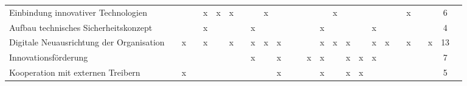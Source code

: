 \begin{sidewaystable}[ht]
\begin{tabular}{|p{6.5cm}|c|c|c|c|c|c|c|c|c|c|c|c|c|c|c|c|c|c|c|c|c|c|c|c|c|}
		Einbindung innovativer Technologien                 &                   &                    &                    & x                    & x                  & x                 &                   &                      & x                  &                      &                  &                  &                     &                  & x               &                      &                    &                 &                  &                  & x                      &                      &                        & 6  \\
		Aufbau technisches Sicherheitskonzept      &                   &                    &                    & x                    &                    &                   &                   & x                    &                    &                      &                  &                  &                     & x                &                 &                      &                    & x               &                  &                  &                        &                      &                        & 4  \\
		Digitale Neuausrichtung der Organisation            &                   & x                  &                    & x                    &                    & x                 &                   & x                    & x                  & x                    &                  &                  &                     & x                & x               & x                    &                    & x               & x                &                  & x                      &                      & x                      & 13 \\
		Innovationsförderung                                &                   &                    &                    &                      &                    &                   &                   & x                    &                    & x                    &                  &                  & x                   & x                &                 & x                    & x                  & x               &                  &                  &                        &                      &                        & 7  \\
		Kooperation mit externen Treibern                   &                   & x                  &                    &                      &                    &                   &                   &                      &                    & x                    &                  &                  &                     & x                &                 & x                    & x                  &                 &                  &                  &                        &                      &                        & 5 \\
		\hline
	\end{tabular}
	\label{tab:clusteringchangeprocess}
\end{sidewaystable}

